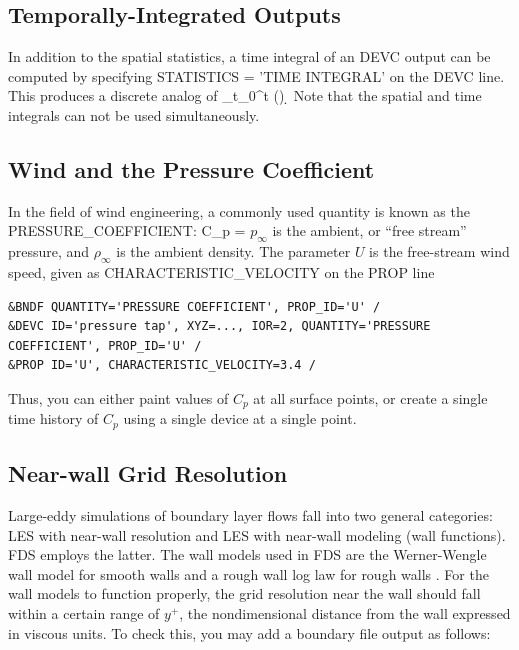 \documentclass[11pt]{book}
\begin{document}
\subsection{Temporally-Integrated Outputs}
\label{info:time_integral}

In addition to the spatial statistics, a time integral of an {\ct DEVC} output can be computed by specifying
{\ct STATISTICS = 'TIME INTEGRAL'} on the {\ct DEVC} line. This produces a discrete analog of
\be
 \int_{t_0}^t \phi(\tau) \; \d \tau
\ee
Note that the spatial and time integrals can not be used simultaneously.



\subsection{Wind and the Pressure Coefficient}
\label{info:wind}

In the field of wind engineering, a commonly used quantity is known as
the {\ct PRESSURE\_COEFFICIENT}:
\be
   C_p = 
\ee
$p_\infty$ is the ambient, or ``free stream'' pressure, and
$\rho_\infty$ is the ambient density.  The parameter $U$ is the
free-stream wind speed, given as {\ct CHARACTERISTIC\_VELOCITY} on the
{\ct PROP} line

\begin{lstlisting}
&BNDF QUANTITY='PRESSURE COEFFICIENT', PROP_ID='U' /
&DEVC ID='pressure tap', XYZ=..., IOR=2, QUANTITY='PRESSURE COEFFICIENT', PROP_ID='U' /
&PROP ID='U', CHARACTERISTIC_VELOCITY=3.4 /
\end{lstlisting}

\noindent
Thus, you can either paint values of $C_p$ at all surface points, or create a single time history of $C_p$ using a single device at a single point.

\subsection{Near-wall Grid Resolution}
\label{info:yplus}

Large-eddy simulations of boundary layer flows fall into two general categories: LES with near-wall resolution and LES with near-wall modeling (wall functions).  FDS employs the latter.  The wall models used in FDS are the Werner-Wengle wall model \cite{Werner:1991} for smooth walls and a rough wall log law for rough walls \cite{Pope:2000}.  For the wall models to function properly, the grid resolution near the wall should fall within a certain range of $y^+$, the nondimensional distance from the wall expressed in viscous units.  To check this, you may add a boundary file output as follows:
\end{document}
